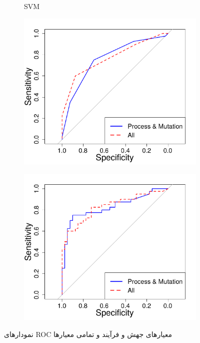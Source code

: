 \begin{figure}[H]
\begin{subfigure}{.5\textwidth}
		\caption{SVM}
	\end{subfigure}
	\begin{subfigure}{.5\textwidth}
		\centering
		\includegraphics[width= \linewidth]{img/evaluation/phase2-part2-roc-lr.pdf}
		\caption{}
	\end{subfigure}
	\begin{subfigure}{.5\textwidth}
		\centering
		\includegraphics[width= \linewidth]{img/evaluation/phase2-part2-roc-nn.pdf}
		\caption{}
	\end{subfigure}
	\caption{نمودارهای ROC معیارهای جهش و فرآیند و تمامی معیارها }
	\label{fig:ROC-phase2-part2}
\end{figure}

